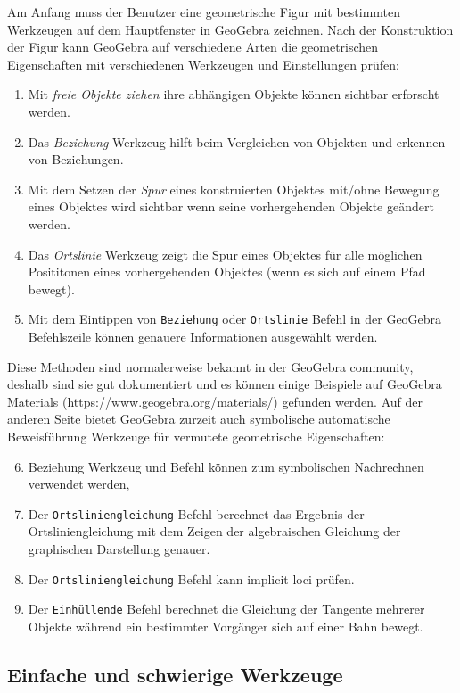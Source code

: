 \documentclass{article}
\begin{document}
Am Anfang muss der Benutzer eine geometrische Figur mit bestimmten Werkzeugen auf dem Hauptfenster in GeoGebra zeichnen. Nach der Konstruktion der Figur kann GeoGebra auf verschiedene Arten die geometrischen Eigenschaften mit verschiedenen Werkzeugen und Einstellungen prüfen:
\begin{enumerate}
    \item Mit \textit{freie Objekte ziehen} ihre abhängigen Objekte können sichtbar erforscht werden.
    \item Das \textit{Beziehung} Werkzeug hilft beim Vergleichen von Objekten und erkennen von Beziehungen.
    \item Mit dem Setzen der  \textit{Spur} eines konstruierten Objektes mit/ohne Bewegung eines Objektes wird sichtbar wenn seine vorhergehenden Objekte geändert werden.
    \item Das \textit{Ortslinie} Werkzeug zeigt die Spur eines Objektes für alle möglichen Posititonen eines vorhergehenden Objektes (wenn es sich auf einem Pfad bewegt).
    \item Mit dem Eintippen von \texttt{Beziehung} oder \texttt{Ortslinie} Befehl in der GeoGebra Befehlszeile können genauere Informationen ausgewählt werden. 
\end{enumerate}
Diese Methoden sind normalerweise bekannt in der GeoGebra community, deshalb sind sie gut dokumentiert und es können einige Beispiele auf GeoGebra Materials (\url{https://www.geogebra.org/materials/}) gefunden werden. Auf der anderen Seite bietet GeoGebra zurzeit auch symbolische automatische Beweisführung Werkzeuge für vermutete geometrische Eigenschaften:
\begin{enumerate}
\setcounter{enumi}{5}
    \item Beziehung Werkzeug und Befehl können zum symbolischen Nachrechnen verwendet werden,
    \item Der \texttt{Ortsliniengleichung} Befehl berechnet das Ergebnis der Ortsliniengleichung mit dem Zeigen der algebraischen Gleichung der graphischen Darstellung genauer.
    \item Der \texttt{Ortsliniengleichung} Befehl kann implicit loci prüfen.
    \item Der \texttt{Einhüllende} Befehl berechnet die Gleichung der Tangente mehrerer Objekte während ein bestimmter Vorgänger sich auf einer Bahn bewegt.
\end{enumerate}

\subsection{Einfache und schwierige Werkzeuge}
\end{document}
